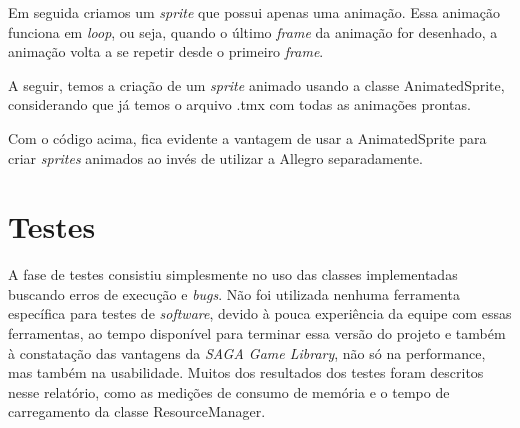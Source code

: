%
Em seguida criamos um \textit{sprite} que possui apenas uma animação. Essa animação funciona em \textit{loop}, ou seja, quando o último \textit{frame} da animação for desenhado, a animação volta a se repetir desde o primeiro \textit{frame}.
%

%
\par 
A seguir, temos a criação de um \textit{sprite} animado usando a classe AnimatedSprite, considerando que já temos o arquivo .tmx com todas as animações prontas.
%

%
Com o código acima, fica evidente a vantagem de usar a AnimatedSprite para criar \textit{sprites} animados ao invés de utilizar a Allegro separadamente.
%
%
%
\section{Testes}
%
A fase de testes consistiu simplesmente no uso das classes implementadas buscando erros de execução e \textit{bugs}. Não foi utilizada nenhuma ferramenta específica para testes de \textit{software}, devido à pouca experiência da equipe com essas ferramentas, ao tempo disponível para terminar essa versão do projeto e também à constatação das vantagens da \textit{SAGA Game Library}, não só na performance, mas também na usabilidade. Muitos dos resultados dos testes foram descritos nesse relatório, como as medições de consumo de memória e o tempo de carregamento da classe ResourceManager. 
%


